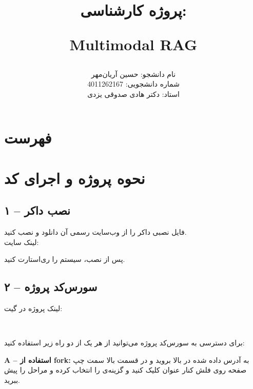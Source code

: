 \documentclass{article}
\begin{document}
\title{پروژه کارشناسی: \\
\begin{LTR}
Multimodal RAG
\end{LTR}}

\author{
نام دانشجو: حسین آریان‌مهر\\
شماره دانشجویی: 4011262167\\
استاد: دکتر هادی صدوقی یزدی
}

\date{}
\maketitle




\newpage
\section{فهرست}

\tableofcontents
\newpage




\section{نحوه  پروژه و اجرای کد}

\subsection{۱ – نصب داکر}
فایل نصبی داکر را از وب‌سایت رسمی آن دانلود و نصب کنید.\\
لینک سایت:
\begin{center}
\end{center}
پس از نصب، سیستم را ری‌استارت کنید.

\subsection{۲ – سورس‌کد پروژه}
لینک پروژه در گیت:
\begin{center}
‫\end{center}

برای دسترسی به سورس‌کد پروژه می‌توانید از هر یک از دو راه زیر استفاده کنید:

\textbf{A – استفاده از fork:}  
به آدرس داده شده در بالا بروید و در قسمت بالا سمت چپ صفحه روی فلش کنار عنوان  کلیک کنید و گزینه‌ی  را انتخاب کرده و مراحل را پیش ببرید.
\end{document}
